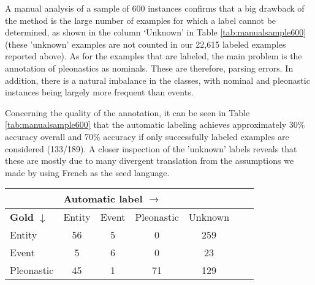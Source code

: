\documentclass[10pt, a4paper]{article}
\begin{document}
A manual analysis of a sample of 600 instances confirms that a big drawback of  
the method is the large number of examples for which a label cannot be determined, 
as shown in the column `Unknown' in Table \ref{tab:manualsample600} (these 
'unknown' examples are not counted in our 22,615 labeled examples reported above). 
As for the examples that are labeled, the main 
problem is the annotation of pleonastics as nominals. These are therefore, 
parsing errors. In addition, there is a natural imbalance in the classes, with 
nominal and pleonastic instances being largely more frequent than events.  

Concerning the quality of the annotation, it can
be seen in Table \ref{tab:manualsample600} that the automatic labeling achieves 
approximately 30\% accuracy overall and 70\% accuracy if only successfully labeled  
examples are considered (133/189). A closer 
inspection of the 'unknown' labels reveals that these are mostly due to many 
divergent translation from the assumptions we made by using French as the seed 
language.  

\begin{table*}[h!]\centering 
\begin{tabular}{p{1.3cm}|cccccc} 
&\multicolumn{4}{l}{\textbf{Automatic label $\rightarrow$}}\\
\toprule 
{\textbf{Gold $\downarrow$}}&Entity & Event &Pleonastic & Unknown \\ 
\midrule Entity &   56  &  5   &   0     &  259  \\ 
Event &    5  &  6   &  0  &  23\\ 
Pleonastic& 45 & 1&  71&  129\\
\bottomrule 
\end{tabular} \caption{Manual evaluation of a sample of 600
instances.}\label{tab:manualsample600} 
\end{table*}

%
%
%
%
\end{document}
